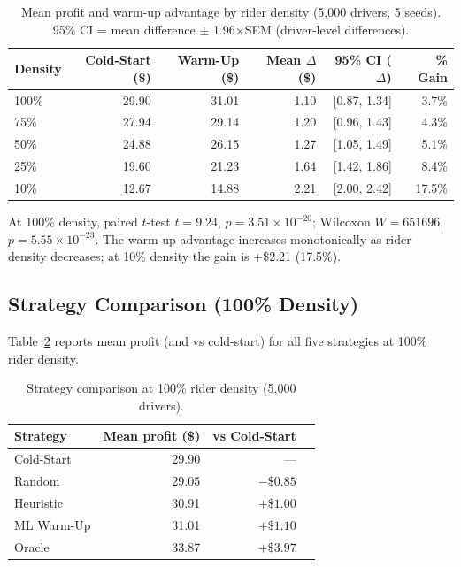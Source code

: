 \documentclass[11pt,a4paper]{article}
\begin{document}
\begin{table}[htbp]
\centering
\caption{Mean profit and warm-up advantage by rider density (5,000 drivers, 5 seeds). 95\% CI = mean difference $\pm$ 1.96$\times$SEM (driver-level differences).}
\label{tab:density}
\begin{tabular}{lrrrrr}
\toprule
Density & Cold-Start (\$) & Warm-Up (\$) & Mean $\Delta$ (\$) & 95\% CI ($\Delta$) & \% Gain \\
\midrule
100\% & 29.90 & 31.01 & 1.10 & [0.87, 1.34] & 3.7\% \\
75\%  & 27.94 & 29.14 & 1.20 & [0.96, 1.43] & 4.3\% \\
50\%  & 24.88 & 26.15 & 1.27 & [1.05, 1.49] & 5.1\% \\
25\%  & 19.60 & 21.23 & 1.64 & [1.42, 1.86] & 8.4\% \\
10\%  & 12.67 & 14.88 & 2.21 & [2.00, 2.42] & 17.5\% \\
\bottomrule
\end{tabular}
\end{table}

At 100\% density, paired $t$-test $t = 9.24$, $p = 3.51 \times 10^{-20}$; Wilcoxon $W = 651696$, $p = 5.55 \times 10^{-23}$. The warm-up advantage increases monotonically as rider density decreases; at 10\% density the gain is +\$2.21 (17.5\%).

\subsection{Strategy Comparison (100\% Density)}

Table~\ref{tab:strategies} reports mean profit (and vs cold-start) for all five strategies at 100\% rider density.

\begin{table}[htbp]
\centering
\caption{Strategy comparison at 100\% rider density (5,000 drivers).}
\label{tab:strategies}
\begin{tabular}{lrrl}
\toprule
Strategy & Mean profit (\$) & \multicolumn{1}{c}{vs Cold-Start} \\
\midrule
Cold-Start & 29.90 & --- \\
Random     & 29.05 & $-\$0.85$ \\
Heuristic  & 30.91 & $+\$1.00$ \\
ML Warm-Up & 31.01 & $+\$1.10$ \\
Oracle     & 33.87 & $+\$3.97$ \\
\bottomrule
\end{tabular}
\end{table}
\end{document}
